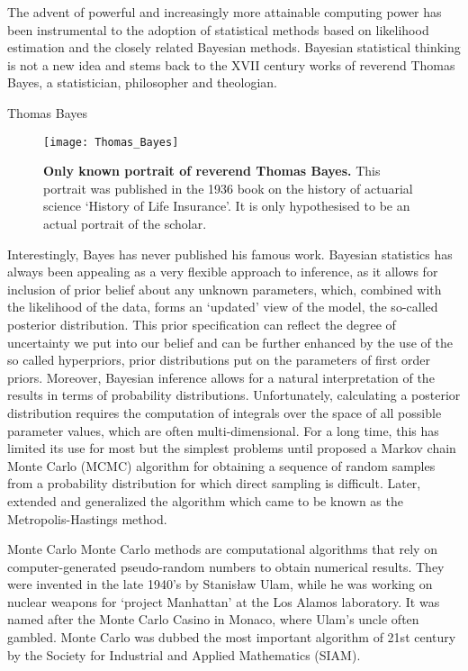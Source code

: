 The advent of powerful and increasingly more attainable computing power has been instrumental to the adoption of statistical methods based on likelihood estimation and the closely related Bayesian methods.
Bayesian statistical thinking is not a new idea and stems back to the XVII century works of reverend Thomas Bayes, a statistician, philosopher and theologian. 

\clearpage

\begin{remark}{Thomas Bayes}
\begin{figure}[H]
\centering
\texttt{[image: Thomas\_Bayes]} 
\caption{
{ \footnotesize 
{\bf Only known portrait of reverend Thomas Bayes.} This portrait was published in the 1936 book on the history of actuarial science `History of Life Insurance'. It is only hypothesised to be an actual portrait of the scholar.
}%
}
\label{fig:bayes}
\end{figure}
\end{remark}

Interestingly, Bayes has never published his famous work.
Bayesian statistics has always been appealing as a very flexible approach to inference, as it allows for inclusion of prior belief about any unknown parameters, which, combined with the likelihood of the data, forms an `updated' view of the model, the so-called posterior distribution.
This prior specification can reflect the degree of uncertainty we put into our belief and can be further enhanced by the use of the so called hyperpriors, prior distributions put on the parameters of first order priors.
Moreover, Bayesian inference allows for a natural interpretation of the results in terms of probability distributions. 
Unfortunately, calculating a posterior distribution requires the computation of integrals over the space of all possible parameter values, which are often multi-dimensional.
For a long time, this has limited its use for most but the simplest problems until \cite{Metropolis1953} proposed a Markov chain Monte Carlo (MCMC) algorithm for obtaining a sequence of random samples from a probability distribution for which direct sampling is difficult. 
Later, \cite{Hasting1970} extended and generalized the algorithm which came to be known as the Metropolis-Hastings method.

\begin{remark}{Monte Carlo}
Monte Carlo methods are computational algorithms that rely on computer-generated pseudo-random numbers to obtain numerical results. 
They were invented in the late 1940's by Stanis\l{}aw Ulam, while he was working on nuclear weapons for `project Manhattan'
at the Los Alamos laboratory.  
It was named after the Monte Carlo Casino in Monaco, where Ulam's uncle often gambled.
Monte Carlo was dubbed the most important algorithm of 21st century by the Society for Industrial and Applied Mathematics (SIAM).
\end{remark}

